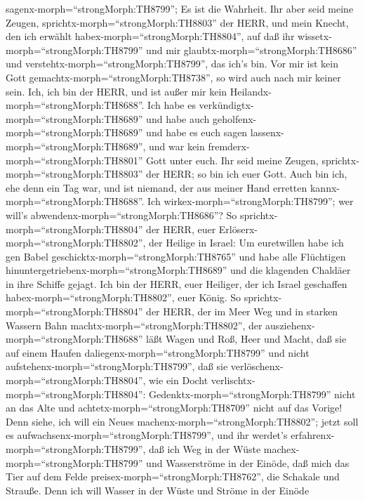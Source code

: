 sagenx-morph=``strongMorph:TH8799''; Es ist die Wahrheit. 
Ihr aber seid meine Zeugen, sprichtx-morph=``strongMorph:TH8803'' der
HERR, und mein Knecht, den ich erwählt
habex-morph=``strongMorph:TH8804'', auf daß ihr
wissetx-morph=``strongMorph:TH8799'' und mir
glaubtx-morph=``strongMorph:TH8686'' und
verstehtx-morph=``strongMorph:TH8799'', das ich's bin. Vor mir ist kein
Gott gemachtx-morph=``strongMorph:TH8738'', so wird auch nach mir keiner
sein.  Ich, ich bin der HERR, und ist außer mir kein
Heilandx-morph=``strongMorph:TH8688''.  Ich habe es
verkündigtx-morph=``strongMorph:TH8689'' und habe auch
geholfenx-morph=``strongMorph:TH8689'' und habe es euch sagen
lassenx-morph=``strongMorph:TH8689'', und war kein
fremderx-morph=``strongMorph:TH8801'' Gott unter euch. Ihr seid meine
Zeugen, sprichtx-morph=``strongMorph:TH8803'' der HERR; so bin ich euer
Gott.  Auch bin ich, ehe denn ein Tag war, und ist niemand,
der aus meiner Hand erretten kannx-morph=``strongMorph:TH8688''. Ich
wirkex-morph=``strongMorph:TH8799''; wer will's
abwendenx-morph=``strongMorph:TH8686''?  So
sprichtx-morph=``strongMorph:TH8804'' der HERR, euer
Erlöserx-morph=``strongMorph:TH8802'', der Heilige in Israel: Um
euretwillen habe ich gen Babel geschicktx-morph=``strongMorph:TH8765''
und habe alle Flüchtigen hinuntergetriebenx-morph=``strongMorph:TH8689''
und die klagenden Chaldäer in ihre Schiffe gejagt.  Ich bin
der HERR, euer Heiliger, der ich Israel geschaffen
habex-morph=``strongMorph:TH8802'', euer König.  So
sprichtx-morph=``strongMorph:TH8804'' der HERR, der im Meer Weg und in
starken Wassern Bahn machtx-morph=``strongMorph:TH8802'', 
der ausziehenx-morph=``strongMorph:TH8688'' läßt Wagen und Roß, Heer und
Macht, daß sie auf einem Haufen daliegenx-morph=``strongMorph:TH8799''
und nicht aufstehenx-morph=``strongMorph:TH8799'', daß sie
verlöschenx-morph=``strongMorph:TH8804'', wie ein Docht
verlischtx-morph=``strongMorph:TH8804'': 
Gedenktx-morph=``strongMorph:TH8799'' nicht an das Alte und
achtetx-morph=``strongMorph:TH8709'' nicht auf das Vorige! 
Denn siehe, ich will ein Neues machenx-morph=``strongMorph:TH8802'';
jetzt soll es aufwachsenx-morph=``strongMorph:TH8799'', und ihr werdet's
erfahrenx-morph=``strongMorph:TH8799'', daß ich Weg in der Wüste
machex-morph=``strongMorph:TH8799'' und Wasserströme in der Einöde,
 daß mich das Tier auf dem Felde
preisex-morph=``strongMorph:TH8762'', die Schakale und Strauße. Denn ich
will Wasser in der Wüste und Ströme in der Einöde
